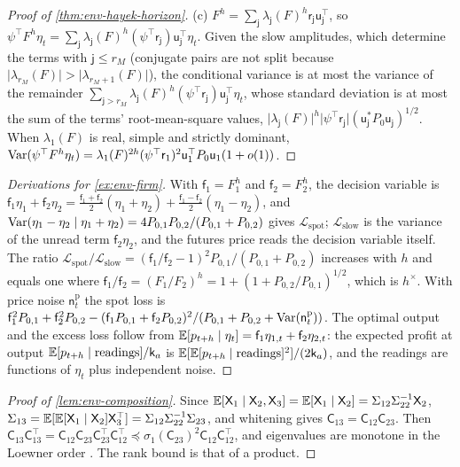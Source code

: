 \begin{proof}[Proof of \cref{thm:env-hayek-horizon}]
(c) $F^h=\sum_{\mathsf j}\lambda_{\mathsf j}(F)^h\mathsf r_{\mathsf j}\mathsf u_{\mathsf j}^\top$, so $\psi^\top F^h\eta_t=\sum_{\mathsf j}\lambda_{\mathsf j}(F)^h(\psi^\top\mathsf r_{\mathsf j})\mathsf u_{\mathsf j}^\top\eta_t$. Given the slow amplitudes, which determine the terms with $\mathsf j\le r_M$ (conjugate pairs are not split because $\lvert\lambda_{r_M}(F)\rvert>\lvert\lambda_{r_M+1}(F)\rvert$), the conditional variance is at most the variance of the remainder $\sum_{\mathsf j>r_M}\lambda_{\mathsf j}(F)^h(\psi^\top\mathsf r_{\mathsf j})\mathsf u_{\mathsf j}^\top\eta_t$, whose standard deviation is at most the sum of the terms' root-mean-square values, $\lvert\lambda_{\mathsf j}(F)\rvert^h\lvert\psi^\top\mathsf r_{\mathsf j}\rvert(\mathsf u_{\mathsf j}^*P_0\mathsf u_{\mathsf j})^{1/2}$. When $\lambda_1(F)$ is real, simple and strictly dominant, $\operatorname{Var}(\psi^\top F^h\eta_t)=\lambda_1(F)^{2h}(\psi^\top\mathsf r_1)^2\mathsf u_1^\top P_0\mathsf u_1(1+o(1))$.
\end{proof}

\begin{proof}[Derivations for \cref{ex:env-firm}]
With $\mathsf f_1=F_1^h$ and $\mathsf f_2=F_2^h$, the decision variable is $\mathsf f_1\eta_1+\mathsf f_2\eta_2=\frac{\mathsf f_1+\mathsf f_2}2(\eta_1+\eta_2)+\frac{\mathsf f_1-\mathsf f_2}2(\eta_1-\eta_2)$, and $\operatorname{Var}(\eta_1-\eta_2\mid\eta_1+\eta_2)=4P_{0,1}P_{0,2}/(P_{0,1}+P_{0,2})$ gives $\mathcal L_{\mathrm{spot}}$; $\mathcal L_{\mathrm{slow}}$ is the variance of the unread term $\mathsf f_2\eta_2$, and the futures price reads the decision variable itself. The ratio $\mathcal L_{\mathrm{spot}}/\mathcal L_{\mathrm{slow}}=(\mathsf f_1/\mathsf f_2-1)^2P_{0,1}/(P_{0,1}+P_{0,2})$ increases with $h$ and equals one where $\mathsf f_1/\mathsf f_2=(F_1/F_2)^h=1+(1+P_{0,2}/P_{0,1})^{1/2}$, which is $h^\times$. With price noise $\mathsf n^{\mathrm p}_t$ the spot loss is $\mathsf f_1^2P_{0,1}+\mathsf f_2^2P_{0,2}-(\mathsf f_1P_{0,1}+\mathsf f_2P_{0,2})^2/(P_{0,1}+P_{0,2}+\operatorname{Var}(\mathsf n^{\mathrm p}_t))$. The optimal output and the excess loss follow from $\mathbb{E}[p_{t+h}\mid\eta_t]=\mathsf f_1\eta_{1,t}+\mathsf f_2\eta_{2,t}$: the expected profit at output $\mathbb{E}[p_{t+h}\mid\text{readings}]/\mathsf k_a$ is $\mathbb{E}[\mathbb{E}[p_{t+h}\mid\text{readings}]^2]/(2\mathsf k_a)$, and the readings are functions of $\eta_t$ plus independent noise.
\end{proof}

\begin{proof}[Proof of \cref{lem:env-composition}]
Since $\mathbb{E}[\mathsf X_1\mid\mathsf X_2,\mathsf X_3]=\mathbb{E}[\mathsf X_1\mid\mathsf X_2]=\Sigma_{12}\Sigma_{22}^{-1}\mathsf X_2$, $\Sigma_{13}=\mathbb{E}[\mathbb{E}[\mathsf X_1\mid\mathsf X_2]\mathsf X_3^\top]=\Sigma_{12}\Sigma_{22}^{-1}\Sigma_{23}$, and whitening gives $\mathsf C_{13}=\mathsf C_{12}\mathsf C_{23}$. Then $\mathsf C_{13}\mathsf C_{13}^\top=\mathsf C_{12}\mathsf C_{23}\mathsf C_{23}^\top\mathsf C_{12}^\top\preceq\sigma_1(\mathsf C_{23})^2\mathsf C_{12}\mathsf C_{12}^\top$, and eigenvalues are monotone in the Loewner order \citep{horn2012matrix}. The rank bound is that of a product.
\end{proof}

